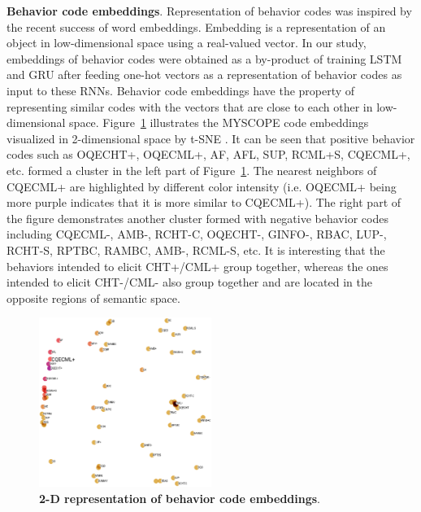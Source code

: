 \documentclass{amia_summit_2018}
\begin{document}
\textbf {Behavior code embeddings}. Representation of behavior codes was inspired by the recent success of word embeddings\cite{bengio2003neural,mikolov2013distributed,pennington2014glove}. Embedding is a representation of an object in low-dimensional space using a real-valued vector. In our study, embeddings of behavior codes were obtained as a by-product of training LSTM and GRU after feeding one-hot vectors as a representation of behavior codes as input to these RNNs. Behavior code embeddings have the property of representing similar codes with the vectors that are close to each other in low-dimensional space. Figure~\ref{fig:code_embedding} illustrates the MYSCOPE code embeddings visualized in 2-dimensional space by t-SNE \cite{maaten2008visualizing}. It can be seen that positive behavior codes such as OQECHT+, OQECML+, AF, AFL, SUP, RCML+S, CQECML+, etc. formed a cluster in the left part of Figure~\ref{fig:code_embedding}. The nearest neighbors of CQECML+ are highlighted by different color intensity (i.e. OQECML+ being more purple indicates that it is more similar to CQECML+). The right part of the figure demonstrates another cluster formed with negative behavior codes including CQECML-, AMB-, RCHT-C, OQECHT-, GINFO-, RBAC, LUP-, RCHT-S, RPTBC, RAMBC, AMB-, RCML-S, etc. It is interesting that the behaviors intended to elicit CHT+/CML+ group together, whereas the ones intended to elicit CHT-/CML- also group together and are located in the opposite regions of semantic space. 
    
\begin{figure}[!htb]
    \centering
    \includegraphics[width=0.50\textwidth]{figures/code_embed.eps}
    \caption{\textbf{2-D representation of behavior code embeddings}.}
    \label{fig:code_embedding}
\end{figure}
\end{document}
